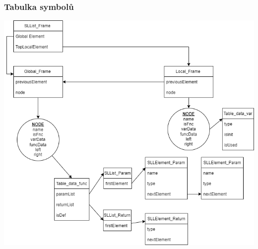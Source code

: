 \begin{frame}
  \frametitle{Tabulka symbolů}
  \centering
  \includegraphics[scale=0.37]{img/Symtable.png}
\end{frame}



